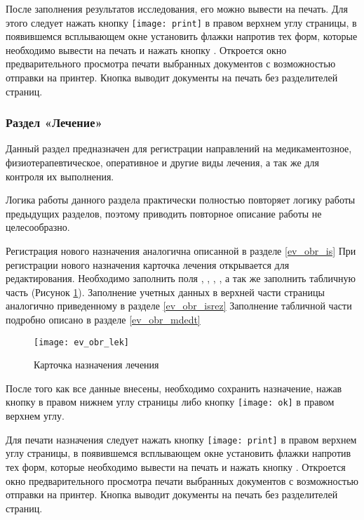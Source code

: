 {{После заполнения результатов исследования, его можно вывести на печать. Для этого следует нажать кнопку \texttt{[image: print]} в правом верхнем углу страницы, в появившемся всплывающем окне установить флажки напротив тех форм, которые необходимо вывести на печать и нажать кнопку . Откроется окно предварительного просмотра печати выбранных документов с возможностью отправки на принтер. Кнопка  выводит документы на печать без разделителей страниц.
}{}

{
\subsubsection{Раздел «Лечение»} \label{ev_obr_lek}

Данный раздел предназначен для регистрации направлений на медикаментозное, физиотерапевтическое, оперативное и другие виды лечения, а так же для контроля их выполнения.

Логика работы данного раздела практически полностью повторяет логику работы предыдущих разделов, поэтому приводить повторное описание работы не целесообразно.

Регистрация нового назначения аналогична описанной в разделе \ref{ev_obr_is} При регистрации нового назначения карточка лечения открывается для редактирования. Необходимо заполнить поля , , , , а так же заполнить табличную часть (Рисунок \ref{img_ev_obr_lek}). Заполнение учетных данных в верхней части страницы аналогично приведенному в разделе \ref{ev_obr_isrez} Заполнение табличной части подробно описано в разделе \ref{ev_obr_mdedt}

 \begin{figure}[ht]\centering
   \texttt{[image: ev\_obr\_lek]}
   \caption{Карточка назначения лечения}
   \label{img_ev_obr_lek}
 \end{figure}
 
После того как все данные внесены, необходимо сохранить назначение, нажав кнопку   в правом нижнем углу страницы либо кнопку \texttt{[image: ok]} в правом верхнем углу.    

Для печати назначения следует нажать кнопку \texttt{[image: print]} в правом верхнем углу страницы, в появившемся всплывающем окне установить флажки напротив тех форм, которые необходимо вывести на печать и нажать кнопку . Откроется окно предварительного просмотра печати выбранных документов с возможностью отправки на принтер. Кнопка  выводит документы на печать без разделителей страниц.
}{}

}
